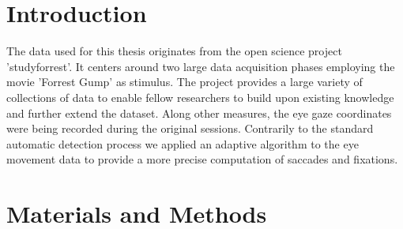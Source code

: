 \documentclass[10pt,a4paper,twocolumn]{article}
\begin{document}



\clearpage
\twocolumn
\section*{Introduction}


The data used for this thesis originates from the open science project 'studyforrest'. It centers around two large data acquisition phases employing the movie 'Forrest Gump' as stimulus. \cite{Hanke.2014,Hanke.2016} The project provides a large variety of collections of data to enable fellow researchers to build upon existing knowledge and further extend the dataset. Along other measures, the eye gaze coordinates were being recorded during the original sessions. Contrarily to the standard automatic detection process we applied an adaptive algorithm to the eye movement data to provide a more precise computation of saccades and fixations. 

\section*{Materials and Methods}

\end{document}
